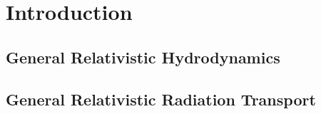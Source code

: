 \chapter{Introduction}
\label{chap:intro}



\section{General Relativistic Hydrodynamics}
\label{sec:gr_hydro}

\section{General Relativistic Radiation Transport}
\label{sec:rad_transport}

